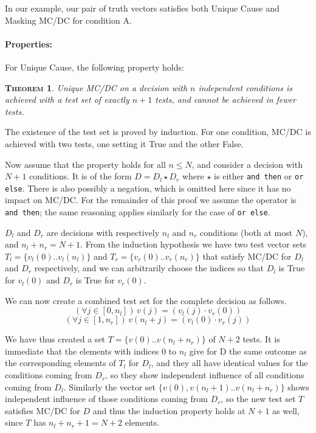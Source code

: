 \documentclass[a4paper,12pt,twoside]{article}
\renewcommand{\le}{\leqslant}
\newcommand{\anysc}{\star}
\newcommand{\andthen}{\texttt{and then}}
\newcommand{\orelse}{\texttt{or else}}
\newtheorem{theorem}{\textsc{Theorem}}
\begin{document}
In our example, our pair of truth vectors satisfies both Unique Cause and
Masking MC/DC for condition A.

\paragraph{Properties:}

For Unique Cause, the following property holds:

\begin{theorem}
Unique MC/DC on a decision with $n$ independent conditions is achieved with
a test set of exactly $n+1$ tests, and cannot be achieved in fewer tests.
\end{theorem}

The existence of the test set is proved by induction. For one condition,
MC/DC is achieved with two tests, one setting it True and the other False.

Now assume that the property holds for all $n \le{} N$, and consider a decision
with $N+1$ conditions. It is of the form $D = D_l \anysc{} D_r$ where
$\anysc{}$ is either \andthen{} or \orelse{}. There is also possibly a
negation, which is omitted here since it has no impact on MC/DC. For the
remainder of this proof we assume the operator is \andthen{}; the same
reasoning applies similarly for the case of \orelse{}.

$D_l$ and $D_r$ are decisions with respectively $n_l$ and $n_r$ conditions
(both at most $N$), and $n_l + n_r = N+1$. From the induction hypothesis
we have two test vector sets $T_l = \{ v_l (0) .. v_l (n_l) \}$ and
$T_r = \{ v_r (0) .. v_r (n_r) \}$ that satisfy MC/DC for $D_l$ and $D_r$
respectively, and we can arbitrarily choose the indices so that
$D_l$ is True for $v_l(0)$ and $D_r$ is True for $v_r (0)$.

We can now create a combined test set for the complete decision as follows.
$$(\forall j \in [0, n_l])\, v (j) = (v_l (j) \cdot v_r (0))$$
$$(\forall j \in [1, n_r])\, v (n_l + j) = (v_l (0) \cdot v_r (j))$$

We have thus created a set $T = \{ v(0) .. v(n_l + n_r) \}$ of $N+2$ tests.
It is immediate that the elements with indices 0 to $n_l$ give for D
the same outcome as the corresponding elements of $T_l$ for $D_l$,
and they all have identical values for the conditions coming from $D_r$,
so they show independent influence of all conditions coming from $D_l$.
Similarly the vector set $\{v(0), v(n_l+1) .. v(n_l + n_r)\}$ shows
independent influence of those conditions coming from $D_r$, so the new
test set $T$ satisfies MC/DC for $D$ and thus the induction property holds at
$N+1$ as well, since $T$ has $n_l + n_r + 1 = N+2$ elements.
\end{document}
